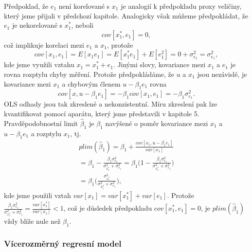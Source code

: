 Předpoklad, že $e_1$ není korelované s $x_1$ je analogií k předpokladu proxy veličiny, který jsme přijali v předchozí kapitole. Analogicky však můžeme předpokládat, že $e_1$ je nekorelované s $x_1^*$, neboli
\begin{equation}
cov[x_1^*, e_1] = 0,
\end{equation}
což implikuje korelaci mezi $e_1$ a $x_1$, protože
\begin{equation}
cov[x_1, e_1] = E[x_1 e_1] = E[x_1^* e_1] + E[e_1^2] = 0 + \sigma_{e_1}^2 = \sigma_{e_1}^2,
\end{equation}
kde jsme využili vztahu $x_1 = x_1^* + e_1$. Jinými slovy, kovariance mezi $x_1$ a $e_1$ je rovna rozptylu chyby měření. Protože předpokládáme, že $u$ a $x_1$ jsou nezávislé, je kovariance mezi $x_1$ a chybovým členem $u - \beta_1 e_1$ rovna
\begin{equation}
cov[x, u - \beta_1 e_1] = -\beta_1 cov[x_1, e_1] = -\beta_1 \sigma_{e_1}^2.
\end{equation}
OLS odhady jsou tak zkreslené a nekonzistentní. Míru zkreslení pak lze kvantifikovat pomocí aparátu, který jsme představili v kapitole 5. Pravděpodobnostní limit $\hat{\beta}_1$ je $\beta_1$ navýšené o poměr kovariance mezi $x_1$ a $u - \beta_1 e_1$ a rozptylu $x_1$, tj.
\begin{multline}
plim(\hat{\beta}_1) = \beta_1 + \frac{cov[x_1, u - \beta_1 e_1]}{var[x_1]}\\
= \beta_1 - \frac{\beta_1 \sigma_{e_1}^2}{\sigma_{x_1^*}^2 + \sigma_{e_1}^2} = \beta_1 \Big(1 - \frac{\beta_1 \sigma_{e_1}^2}{\sigma_{x_1^*}^2 + \sigma_{e_1}^2} \Big)\\
= \beta_1 \Big(\frac{\sigma_{x_1^*}^2}{\sigma_{x_1^2}^2 + \sigma_{e_1}^2}\Big),
\end{multline}
kde jsme použili vztah $var[x_1] = var[x_1^*] + var[e_1]$. Protože $\frac{\beta_1 \sigma_{e_1}^2}{\sigma_{x_1^*}^2 + \sigma_{e_1}^2} = \frac{var[x_1^*]}{var[x_1]} < 1$, což je důsledek předpokladu $cov[x_1^*, e_1] = 0$, je $plim(\hat{\beta}_1)$ vždy blíže nule než $\beta_1$.

\subsubsection{Vícerozměrný regresní model}

